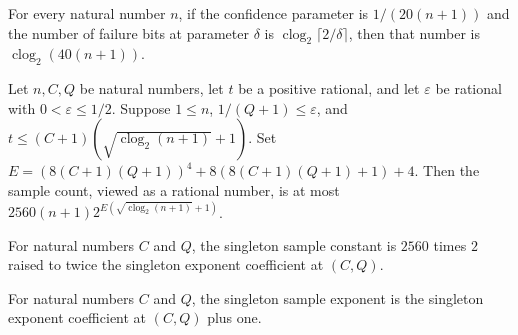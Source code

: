 \begin{theorem}
\label{FABL.singletonInfluenceFailureBits_eq}
\leanok
{}
For every natural number $n$, if the confidence parameter is $1/(20(n+1))$ and the
number of failure bits at parameter $\delta$ is $\operatorname{clog}_2\lceil
2/\delta\rceil$, then that number is $\operatorname{clog}_2(40(n+1))$.
\end{theorem}

\begin{theorem}
\label{FABL.singletonInfluenceSampleCount_cast_le_subsqrt}
\leanok
{}
Let $n,C,Q$ be natural numbers, let $t$ be a positive rational, and let $\varepsilon$ be
rational with $0<\varepsilon\le 1/2$. Suppose $1\le n$, $1/(Q+1)\le\varepsilon$, and
$t\le(C+1)(\sqrt{\operatorname{clog}_2(n+1)}+1)$. Set
$E=(8(C+1)(Q+1))^4+8(8(C+1)(Q+1)+1)+4$. Then the sample count, viewed as a rational
number, is at most $2560(n+1)2^{E(\sqrt{\operatorname{clog}_2(n+1)}+1)}$.
\end{theorem}

\begin{definition}
\label{FABL.learningConsequencesSingletonSampleConstant}
\leanok
{}
For natural numbers $C$ and $Q$, the singleton sample constant is $2560$ times $2$
raised to twice the singleton exponent coefficient at $(C,Q)$.
\end{definition}

\begin{definition}
\label{FABL.learningConsequencesSingletonSampleExponent}
\leanok
{}
For natural numbers $C$ and $Q$, the singleton sample exponent is the singleton exponent
coefficient at $(C,Q)$ plus one.
\end{definition}

